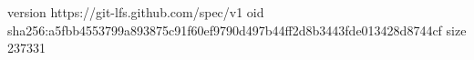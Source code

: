 version https://git-lfs.github.com/spec/v1
oid sha256:a5fbb4553799a893875c91f60ef9790d497b44ff2d8b3443fde013428d8744cf
size 237331
